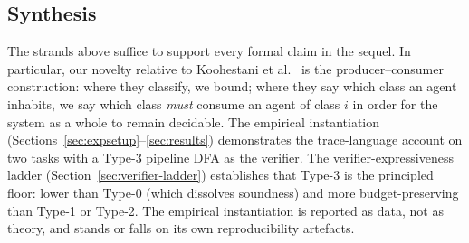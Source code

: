 \subsection{Synthesis}

The strands above suffice to support every formal claim in the
sequel.  In particular, our novelty relative to
Koohestani et al.~\cite{koohestani2025automata} is the
producer--consumer construction: where they classify, we bound;
where they say which class an agent inhabits, we say which class
\emph{must} consume an agent of class $i$ in order for the system
as a whole to remain decidable.  The empirical instantiation
(Sections~\ref{sec:expsetup}--\ref{sec:results}) demonstrates the
trace-language account on two tasks with a Type-3 pipeline DFA
as the verifier.  The verifier-expressiveness ladder
(Section~\ref{sec:verifier-ladder}) establishes that Type-3 is the
principled floor: lower than Type-0 (which dissolves soundness)
and more budget-preserving than Type-1 or Type-2.  The empirical
instantiation is reported as data, not as theory, and stands or
falls on its own reproducibility artefacts.
